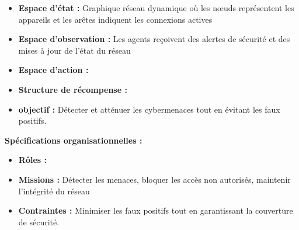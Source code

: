 \begin{itemize}
  \item \textbf{Espace d'état :} Graphique réseau dynamique où les nœuds représentent les appareils et les arêtes indiquent les connexions actives
  \item \textbf{Espace d'observation :} Les agents reçoivent des alertes de sécurité et des mises à jour de l'état du réseau
  \item \textbf{Espace d'action :}
  \item \textbf{Structure de récompense :}
  \item \textbf{objectif :} Détecter et atténuer les cybermenaces tout en évitant les faux positifs.
\end{itemize}
%
\textbf{Spécifications organisationnelles :}
\begin{itemize}
  \item \textbf{Rôles :} 
  \item \textbf{Missions :} Détecter les menaces, bloquer les accès non autorisés, maintenir l'intégrité du réseau
  \item \textbf{Contraintes :} Minimiser les faux positifs tout en garantissant la couverture de sécurité.
\end{itemize}

